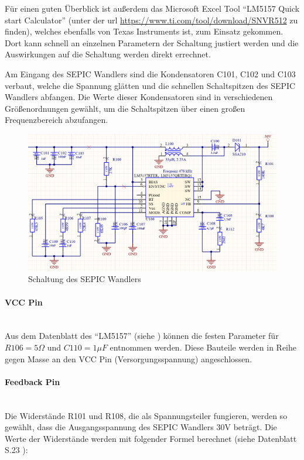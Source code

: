Für einen guten Überblick ist außerdem das Microsoft Excel Tool \enquote{LM5157 Quick start Calculator} (unter der url \url{
https://www.ti.com/tool/download/SNVR512} zu finden), welches ebenfalls von Texas Instruments ist, zum Einsatz gekommen. 
Dort kann schnell an einzelnen Parametern der Schaltung justiert werden und die Auswirkungen auf die Schaltung werden 
direkt errechnet.

Am Eingang des \ac{SEPIC} Wandlers sind die Kondensatoren C101, C102 und C103 verbaut, welche die Spannung glätten und die
schnellen Schaltspitzen des \ac{SEPIC} Wandlers abfangen. Die Werte dieser Kondensatoren sind in verschiedenen Größenordnungen
gewählt, um die Schaltspitzen über einen großen Frequenzbereich abzufangen.

\begin{figure}[H]
    \centering
    \includegraphics[width=1\textwidth]{resources/images/Sepic_sp.png}
    \caption[SEPIC Schaltung]{Schaltung des SEPIC Wandlers}
    \label{fig:sepic_sp}
\end{figure}

\paragraph{VCC Pin}\mbox{}\\
Aus dem Datenblatt des \enquote{LM5157} (siehe \cite{LM5157}) können die festen Parameter für \(R106 = 5\Omega\) und
\(C110 = 1\mu F\) entnommen werden. Diese Bauteile werden in Reihe gegen Masse an den VCC Pin (Versorgungsspannung)
angeschlossen.

\paragraph{Feedback Pin}\mbox{}\\
Die Widerstände R101 und R108, die als Spannungsteiler fungieren, werden so gewählt, dass die Ausgangsspannung
des \ac{SEPIC} Wandlers 30V beträgt. Die Werte der Widerstände werden mit folgender Formel berechnet (siehe
Datenblatt S.23 \cite{LM5157}):

